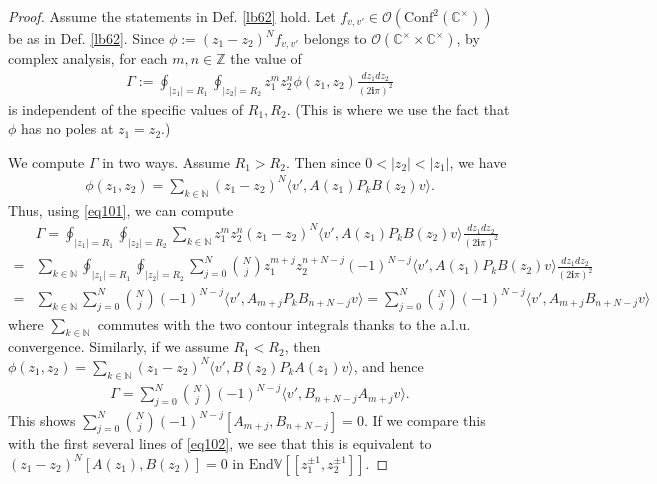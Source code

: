 \documentclass[11pt,b5paper,notitlepage]{article}
\theoremstyle{definition}
\theoremstyle{plain}
\newcommand{\End}{\mathrm{End}} %
\newcommand{\Conf}{\mathrm{Conf}}
\newcommand{\bk}[1]{\langle {#1}\rangle}
\newcommand{\scr}{\mathscr}
\newcommand{\im}{\mathbf{i}}
\newcommand{\Vbb}{\mathbb V}
\newcommand{\Cbb}{\mathbb C}
\newcommand{\Nbb}{\mathbb N}
\newcommand{\Zbb}{\mathbb Z}
\numberwithin{equation}{section}
\begin{document}
\begin{proof}
Assume the statements in Def. \ref{lb62} hold. Let $f_{v,v'}\in\scr O(\Conf^2(\Cbb^\times))$ be as in Def. \ref{lb62}. Since $\phi:=(z_1-z_2)^Nf_{v,v'}$ belongs to $\scr O(\Cbb^\times\times\Cbb^\times)$, by complex analysis, for each $m,n\in\Zbb$ the value of
\begin{align*}
\Gamma:=\oint_{|z_1|=R_1}\oint_{|z_2|=R_2}z_1^mz_2^n \phi(z_1,z_2)	\frac{dz_1dz_2}{(2\im\pi)^2}
\end{align*}
is independent of the specific values of $R_1,R_2$. (This is where we use the fact that $\phi$ has no poles at $z_1=z_2$.)

We compute $\Gamma$ in two ways. Assume $R_1>R_2$. Then since $0<|z_2|<|z_1|$, we have
\begin{align*}
\phi(z_1,z_2)=\sum_{k\in\Nbb}(z_1-z_2)^N\bk{v',A(z_1)P_kB(z_2)v}.	
\end{align*}
Thus, using \eqref{eq101}, we can compute
\begin{align*}
&\Gamma=	\oint_{|z_1|=R_1}\oint_{|z_2|=R_2}\sum_{k\in\Nbb} z_1^mz_2^n (z_1-z_2)^N\bk{v',A(z_1)P_kB(z_2)v}	\frac{dz_1dz_2}{(2\im\pi)^2}\\
=&\sum_{k\in\Nbb} \oint_{|z_1|=R_1}\oint_{|z_2|=R_2}\sum_{j=0}^N {N\choose j}z_1^{m+j}z_2^{n+N-j} (-1)^{N-j}\bk{v',A(z_1)P_kB(z_2)v}	\frac{dz_1dz_2}{(2\im\pi)^2}\\
=&\sum_{k\in\Nbb}\sum_{j=0}^N{N\choose j}(-1)^{N-j}\bk{v',A_{m+j}P_kB_{n+N-j}v}=\sum_{j=0}^N{N\choose j}(-1)^{N-j}\bk{v',A_{m+j}B_{n+N-j}v}
\end{align*}
where $\sum_{k\in\Nbb}$ commutes with the two contour integrals thanks to the a.l.u. convergence. Similarly, if we assume $R_1<R_2$, then $\phi(z_1,z_2)=\sum_{k\in\Nbb}(z_1-z_2)^N\bk{v',B(z_2)P_kA(z_1)v}$, and hence
\begin{align*}
	\Gamma=\sum_{j=0}^N{N\choose j}(-1)^{N-j}\bk{v',B_{n+N-j}A_{m+j}v}.
\end{align*}
This shows $\sum_{j=0}^N{N\choose j}(-1)^{N-j}[A_{m+j},B_{n+N-j}]=0$. If we compare this with the first several lines of \eqref{eq102}, we see that this is equivalent to $(z_1-z_2)^N[A(z_1),B(z_2)]=0$ in $\End\Vbb[[z_1^{\pm1},z_2^{\pm1}]]$. 
\end{proof}




\subsection{}\label{lb70}
\end{document}
